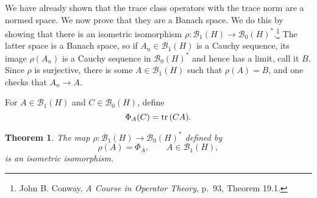 \documentclass{article}
\newcommand{\tr}{\ensuremath\mathrm{tr}\,}
\newtheorem{theorem}{Theorem}
\begin{document}
We have already shown that the trace class operators with the trace norm are a normed space. We now prove that they are a Banach space. We do this by showing that there is an
isometric isomorphism $\rho:\mathscr{B}_1(H) \to \mathscr{B}_0(H)^*$.\footnote{John B. Conway, {\em A Course in Operator Theory}, p.~93, Theorem 19.1.}  The latter space is a Banach space, so if $A_n \in \mathscr{B}_1(H)$ is a Cauchy sequence, its image
$\rho(A_n)$ is a Cauchy sequence in $\mathscr{B}_0(H)^*$ and hence has a limit, call it $B$. Since $\rho$ is surjective, there is some $A \in \mathscr{B}_1(H)$ such that
$\rho(A) = B$, and one checks that $A_n \to A$. 

For $A \in \mathscr{B}_1(H)$ and $C \in \mathscr{B}_0(H)$, define 
\[
\Phi_A(C)=\tr(CA).
\]

\begin{theorem}
The map $\rho:\mathscr{B}_1(H) \to \mathscr{B}_0(H)^*$ defined by
\[
\rho(A)=\Phi_A, \qquad A \in \mathscr{B}_1(H),
\]
is an isometric isomorphism.
\end{theorem}
\end{document}
